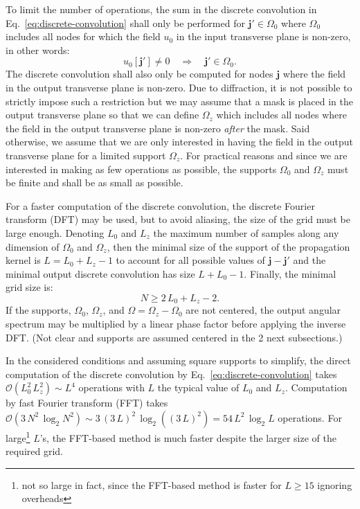 \documentclass[a4paper]{article}
\newcommand{\oops}[1]{{\color{purple}#1}}
\newcommand{\V}[1]{\boldsymbol{#1}}
\newcommand*{\Set}[1]{\mathbb{#1}}
\begin{document}
To limit the number of operations, the sum in the discrete convolution in
Eq.~\eqref{eq:discrete-convolution} shall only be performed for
$\V{j}' \in Ω_{0}$ where $Ω_{0}$ includes all nodes for which the field $u_{0}$
in the input transverse plane is non-zero, in other words:
\begin{equation}
  \label{eq:8}
  u_{0}[\V{j}']
  \not= 0
  \quad\Longrightarrow\quad
  \V{j}' \in Ω_{0}.
\end{equation}
The discrete convolution shall also only be computed for nodes $\V{j}$ where
the field in the output transverse plane is non-zero. Due to diffraction, it is
not possible to strictly impose such a restriction but we may assume that a
mask is placed in the output transverse plane so that we can define $Ω_{z}$
which includes all nodes where the field in the output transverse plane is
non-zero \emph{after} the mask. Said otherwise, we assume that we are only
interested in having the field in the output transverse plane for a limited
support $Ω_{z}$. For practical reasons and since we are interested in making as
few operations as possible, the supports $Ω_{0}$ and $Ω_{z}$ must be finite and
shall be as small as possible.

For a faster computation of the discrete convolution, the discrete Fourier
transform (DFT) may be used, but to avoid aliasing, the size of the grid must
be large enough. Denoting $L_{0}$ and $L_{z}$ the maximum number of samples
along any dimension of $Ω_{0}$ and $Ω_{z}$, then the minimal size of the
support of the propagation kernel is $L = L_{0} + L_{z} - 1$ to account for all
possible values of $\V{j} - \V{j}'$ and the minimal output discrete convolution
has size $L + L_{0} - 1$. Finally, the minimal grid size is:
\begin{equation}
  \label{eq:convolution-grid-size}
  N ≥ 2\,L_{0} + L_{z} - 2.
\end{equation}
If the supports, $Ω_{0}$, $Ω_{z}$, and $Ω = Ω_{z} - Ω_{0}$ are not centered,
the output angular spectrum may be multiplied by a linear phase factor before
applying the inverse DFT. \oops{(Not clear and supports are assumed centered in
  the 2 next subsections.)}

In the considered conditions and assuming square supports to simplify, the
direct computation of the discrete convolution by
Eq.~\eqref{eq:discrete-convolution} takes
$\mathcal{O}(L_{0}^{2}\,L_{z}^{2}) \sim L^{4}$ operations with $L$ the typical
value of $L_{0}$ and $L_{z}$. Computation by fast Fourier transform (FFT) takes
$\mathcal{O}(3\,N^{2}\,\log_{2}N^{2}) \sim 3\,(3\,L)^{2}\,\log_{2}((3\,L)^{2}) = 54\,L^{2}\,\log_{2}L$
operations. For large\footnote{not so large in fact, since the FFT-based method
  is faster for $L ≥ 15$ ignoring overheads} $L$'s, the FFT-based method is
much faster despite the larger size of the required grid.
\end{document}
